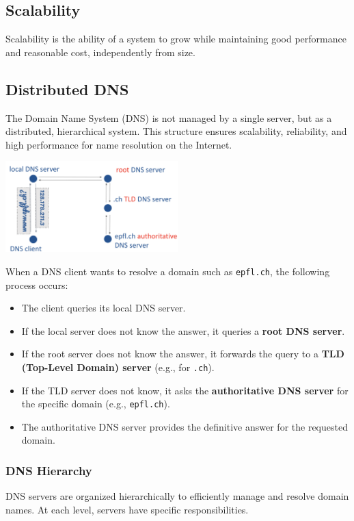 \documentclass[../../compsys.tex]{subfiles}
\begin{document}
\subsection{Scalability}
Scalability is the ability of a system to grow while maintaining good performance and reasonable cost, independently from size.
\subsection{Distributed DNS}
The Domain Name System (DNS) is not managed by a single server, but as a distributed, hierarchical system. This structure ensures scalability, reliability, and high performance for name resolution on the Internet.

\begin{center}
    \includegraphics[width=0.5\textwidth]{images/translation.png}
\end{center}

When a DNS client wants to resolve a domain such as \texttt{epfl.ch}, the following process occurs:
\begin{itemize}
    \item The client queries its local DNS server.
    \item If the local server does not know the answer, it queries a \textbf{root DNS server}.
    \item If the root server does not know the answer, it forwards the query to a \textbf{TLD (Top-Level Domain) server} (e.g., for \texttt{.ch}).
    \item If the TLD server does not know, it asks the \textbf{authoritative DNS server} for the specific domain (e.g., \texttt{epfl.ch}).
    \item The authoritative DNS server provides the definitive answer for the requested domain.
\end{itemize}

\subsubsection{DNS Hierarchy}
DNS servers are organized hierarchically to efficiently manage and resolve domain names. At each level, servers have specific responsibilities.
\end{document}
